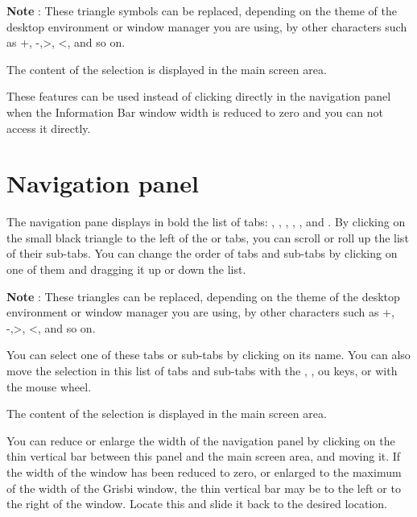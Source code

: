 \textbf{Note} : These triangle symbols can be replaced, depending on the theme of the desktop environment or window manager you are using, by other characters such as +, -,>, <, and so on.

The content of the selection is displayed in the main screen area.

These features can be used instead of clicking directly in the navigation panel when the Information Bar window width is reduced to zero and you can not access it directly.


\section{Navigation panel\label{home-accounting}}

The navigation pane displays in bold the list of tabs:  , , , , ,  and . By clicking on the small black triangle to the left of the   or  tabs,  you can scroll or roll up the list of their sub-tabs. You can change the order of tabs and sub-tabs by clicking on one of them and dragging it up or down the list.

\textbf{Note} : These triangles can be replaced, depending on the theme of the desktop environment or window manager you are using, by other characters such as +, -,>, <, and so on.


You can select one of these tabs or sub-tabs by clicking on its name. You can also move the selection in this list of tabs and sub-tabs with the , ,  ou  keys, or with the mouse wheel. 

The content of the selection is displayed in the main screen area.

You can reduce or enlarge the width of the navigation panel by clicking on the thin vertical bar between this panel and the main screen area, and moving it. If the width of the window has been reduced to zero, or enlarged to the maximum of the width of the Grisbi window, the thin vertical bar may be to the left or to the right of the window.  Locate this and slide it back to the desired location.

